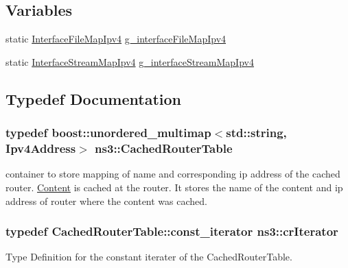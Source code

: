 \subsection*{Variables}
\begin{DoxyCompactItemize}
\item 
static \hyperlink{namespacens3_ab14a5629528234e6f76ad3bb180022fe}{Interface\-File\-Map\-Ipv4} \hyperlink{namespacens3_ac1df4c15ca334fd8713f6600d097c1a6}{g\-\_\-interface\-File\-Map\-Ipv4}
\item 
static \hyperlink{namespacens3_a5634ac4e27d952132fba4cd906d4ebd3}{Interface\-Stream\-Map\-Ipv4} \hyperlink{namespacens3_ad7720e08dcb21331d85c00128abc175a}{g\-\_\-interface\-Stream\-Map\-Ipv4}
\end{DoxyCompactItemize}


\subsection{Typedef Documentation}
\hypertarget{namespacens3_a6e64320f2e97002ba6cd340bbfb76767}{
\subsubsection[{Cached\-Router\-Table}]{\setlength{\rightskip}{0pt plus 5cm}typedef boost\-::unordered\-\_\-multimap$<$std\-::string, Ipv4\-Address$>$ {\bf ns3\-::\-Cached\-Router\-Table}}}\label{namespacens3_a6e64320f2e97002ba6cd340bbfb76767}


container to store mapping of name and corresponding ip address of the cached router. \hyperlink{classns3_1_1Content}{Content} is cached at the router. It stores the name of the content and ip address of router where the content was cached. 

\hypertarget{namespacens3_a0d17c0f2e1efb713fe4a62d283039f06}{
\subsubsection[{cr\-Iterator}]{\setlength{\rightskip}{0pt plus 5cm}typedef Cached\-Router\-Table\-::const\-\_\-iterator {\bf ns3\-::cr\-Iterator}}}\label{namespacens3_a0d17c0f2e1efb713fe4a62d283039f06}


Type Definition for the constant iterater of the Cached\-Router\-Table. 

